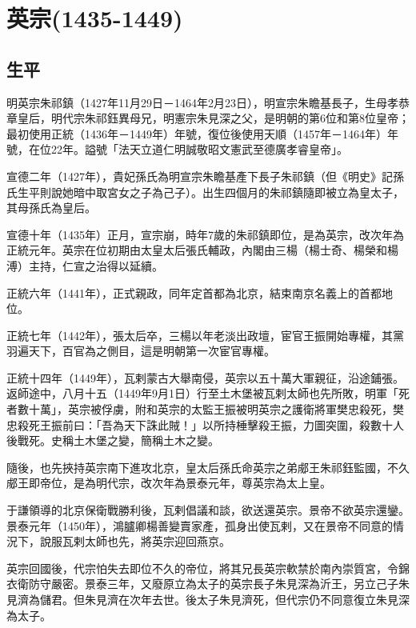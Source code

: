 
\section{英宗\tiny(1435-1449)}

\subsection{生平}

明英宗朱祁鎮（1427年11月29日－1464年2月23日），明宣宗朱瞻基長子，生母孝恭章皇后，明代宗朱祁鈺異母兄，明憲宗朱見深之父，是明朝的第6位和第8位皇帝；最初使用正統（1436年－1449年）年號，復位後使用天順（1457年－1464年）年號，在位22年。謚號「法天立道仁明誠敬昭文憲武至德廣孝睿皇帝」。

宣德二年（1427年），貴妃孫氏為明宣宗朱瞻基產下長子朱祁鎮（但《明史》記孫氏生平則說她暗中取宮女之子為己子）。出生四個月的朱祁鎮隨即被立為皇太子，其母孫氏為皇后。

宣德十年（1435年）正月，宣宗崩，時年7歲的朱祁鎮即位，是為英宗，改次年為正統元年。英宗在位初期由太皇太后張氏輔政，內閣由三楊（楊士奇、楊榮和楊溥）主持，仁宣之治得以延續。

正統六年（1441年），正式親政，同年定首都為北京，結束南京名義上的首都地位。

正統七年（1442年），張太后卒，三楊以年老淡出政壇，宦官王振開始專權，其黨羽遍天下，百官為之側目，這是明朝第一次宦官專權。

正統十四年（1449年），瓦剌蒙古大舉南侵，英宗以五十萬大軍親征，沿途鋪張。返師途中，八月十五（1449年9月1日）行至土木堡被瓦剌太師也先所敗，明軍「死者數十萬」，英宗被俘虜，附和英宗的太監王振被明英宗之護衛將軍樊忠殺死，樊忠殺死王振前曰：「吾為天下誅此賊！」以所持棰擊殺王振，力圖突圍，殺數十人後戰死。史稱土木堡之變，簡稱土木之變。

隨後，也先挾持英宗南下進攻北京，皇太后孫氏命英宗之弟郕王朱祁鈺監國，不久郕王即帝位，是為明代宗，改次年為景泰元年，尊英宗為太上皇。

于謙領導的北京保衛戰勝利後，瓦剌倡議和談，欲送還英宗。景帝不欲英宗還鑾。景泰元年（1450年），鴻臚卿楊善變賣家產，孤身出使瓦剌，又在景帝不同意的情況下，說服瓦剌太師也先，將英宗迎回燕京。

英宗回國後，代宗怕失去即位不久的帝位，將其兄長英宗軟禁於南內崇質宮，令錦衣衛防守嚴密。景泰三年，又廢原立為太子的英宗長子朱見深為沂王，另立己子朱見濟為儲君。但朱見濟在次年去世。後太子朱見濟死，但代宗仍不同意復立朱見深為太子。

